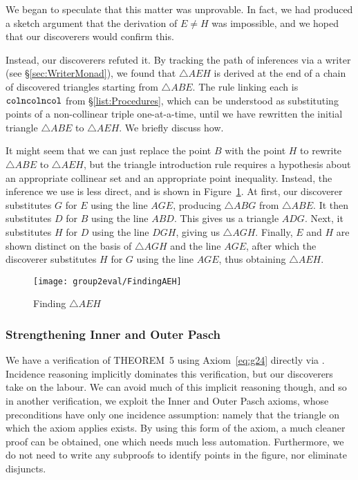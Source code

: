We began to speculate that this matter was unprovable. In fact, we had produced a sketch argument that the derivation of $E\neq H$ was impossible, and we hoped that our discoverers would confirm this.

\label{sec:CombinatoryError}Instead, our discoverers refuted it. By tracking the path of inferences via a writer (see \S\ref{sec:WriterMonad}), we found that $\triangle AEH$ is derived at the end of a chain of discovered triangles starting from $\triangle ABE$. The rule linking each is $\texttt{colncolncol}$ from \S\ref{list:Procedures}, which can be understood as substituting points of a non-collinear triple one-at-a-time, until we have rewritten the initial triangle $\triangle ABE$ to $\triangle AEH$. We briefly discuss how.

It might seem that we can just replace the point $B$ with the point $H$ to rewrite $\triangle ABE$ to $\triangle AEH$, but the triangle introduction rule requires a hypothesis about an appropriate collinear set and an appropriate point inequality. Instead, the inference we use is less direct, and is shown in Figure~\ref{fig:FindingAEH}. At first, our discoverer substitutes $G$ for $E$ using the line $AGE$, producing $\triangle ABG$ from $\triangle ABE$. It then substitutes $D$ for $B$ using the line $ABD$. This gives us a triangle $ADG$. Next, it substitutes $H$ for $D$ using the line $DGH$, giving us $\triangle AGH$. Finally, $E$ and $H$ are shown distinct on the basis of $\triangle AGH$ and the line $AGE$, after which the discoverer substitutes $H$ for $G$ using the line $AGE$, thus obtaining $\triangle AEH$.

\begin{figure}
\centering\texttt{[image: group2eval/FindingAEH]}
\caption{Finding $\triangle AEH$}
\label{fig:FindingAEH}
\end{figure}

\subsubsection{Strengthening Inner and Outer Pasch}\label{sec:StrengthenedPasch}
We have a verification of THEOREM~5 using Axiom~\ref{eq:g24} directly via . Incidence reasoning implicitly dominates this verification, but our discoverers take on the labour. We can avoid much of this implicit reasoning though, and so in another verification, we exploit the Inner and Outer Pasch axioms, whose preconditions have only one incidence assumption: namely that the triangle on which the axiom applies exists. By using this form of the axiom, a much cleaner proof can be obtained, one which needs much less automation. Furthermore, we do not need to write any subproofs to identify points in the figure, nor eliminate disjuncts.

